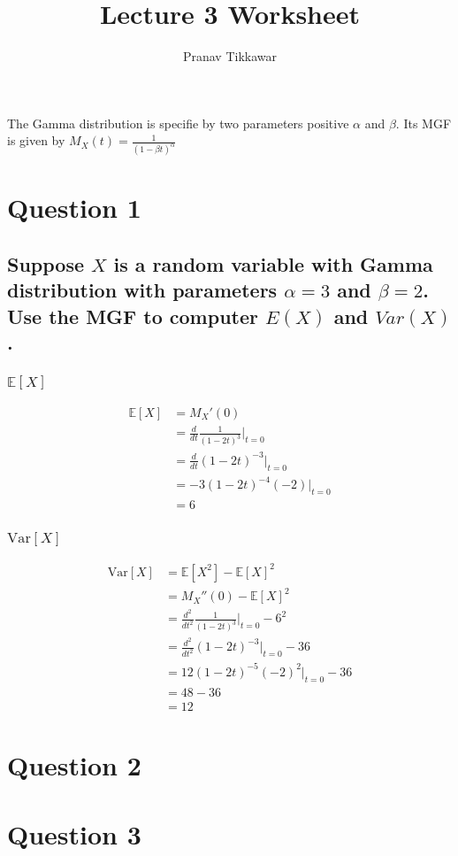 \documentclass{article}
\author{Pranav Tikkawar}
\title{Lecture 3 Worksheet}
\begin{document}
\maketitle

The Gamma distribution is specifie by two parameters positive $\alpha$ and $\beta$. Its MGF is given by $M_X(t) = \frac{1}{(1 - \beta t)^\alpha}$

\section*{Question 1}   
\subsection*{Suppose $X$ is a random variable with Gamma distribution with parameters $\alpha = 3$ and $\beta = 2$. Use the MGF to computer $E(X)$ and $Var(X)$.}
\subsubsection*{$\mathds{E}[X]$}
\begin{align*}
    \mathds{E}[X] &= M_X'(0)\\
    &= \frac{d}{dt} \frac{1}{(1 - 2t)^3} \Big|_{t = 0}\\
    &= \frac{d}{dt} (1 - 2t)^{-3} \Big|_{t = 0}\\
    &= -3(1 - 2t)^{-4}(-2) \Big|_{t = 0}\\
    &= 6
\end{align*}



\subsubsection*{$\text{Var}[X]$}
\begin{align*}
    \text{Var}[X] &= \mathds{E}[X^2] - \mathds{E}[X]^2\\
    &= M_X''(0) - \mathds{E}[X]^2\\
    &= \frac{d^2}{dt^2} \frac{1}{(1 - 2t)^3} \Big|_{t = 0} - 6^2\\
    &= \frac{d^2}{dt^2} (1 - 2t)^{-3} \Big|_{t = 0} - 36\\
    &= 12(1 - 2t)^{-5}(-2)^2 \Big|_{t = 0} - 36\\
    &= 48 - 36\\
    &= 12
\end{align*}



\section*{Question 2}



\section*{Question 3}
\end{document}

